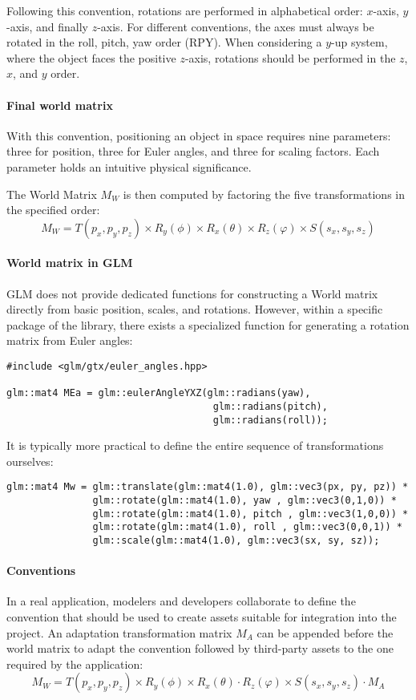 Following this convention, rotations are performed in alphabetical order: $x$-axis, $y$-axis, and finally $z$-axis.
For different conventions, the axes must always be rotated in the roll, pitch, yaw order (RPY).
When considering a $y$-up system, where the object faces the positive $z$-axis, rotations should be performed in the $z$, $x$, and $y$ order.

\paragraph*{Final world matrix}
With this convention, positioning an object in space requires nine parameters: three for position, three for Euler angles, and three for scaling factors. 
Each parameter holds an intuitive physical significance.

The World Matrix $M_W$ is then computed by factoring the five transformations in the specified order:
\[M_W=T(p_x,p_y,p_z)\times R_y(\phi)\times R_x(\theta)\times R_z(\varphi) \times S(s_x,s_y,s_z)\]

\paragraph*{World matrix in GLM}
GLM does not provide dedicated functions for constructing a World matrix directly from basic position, scales, and rotations. 
However, within a specific package of the library, there exists a specialized function for generating a rotation matrix from Euler angles:
\begin{verbatim}
#include <glm/gtx/euler_angles.hpp>

glm::mat4 MEa = glm::eulerAngleYXZ(glm::radians(yaw),
                                    glm::radians(pitch),
                                    glm::radians(roll));
\end{verbatim}
It is typically more practical to define the entire sequence of transformations ourselves:
\begin{verbatim}
glm::mat4 Mw = glm::translate(glm::mat4(1.0), glm::vec3(px, py, pz)) *
               glm::rotate(glm::mat4(1.0), yaw , glm::vec3(0,1,0)) *
               glm::rotate(glm::mat4(1.0), pitch , glm::vec3(1,0,0)) *
               glm::rotate(glm::mat4(1.0), roll , glm::vec3(0,0,1)) *
               glm::scale(glm::mat4(1.0), glm::vec3(sx, sy, sz));
\end{verbatim}

\paragraph*{Conventions}
In a real application, modelers and developers collaborate to define the convention that should be used to create assets suitable for integration into the project. 
An adaptation transformation matrix $M_A$ can be appended before the world matrix to adapt the convention followed by third-party assets to the one required by the application:
\[M_W=T(p_x,p_y,p_z)\times R_y(\phi)\times R_x(\theta)\cdot R_z(\varphi) \times S(s_x,s_y,s_z) \cdot M_A\]